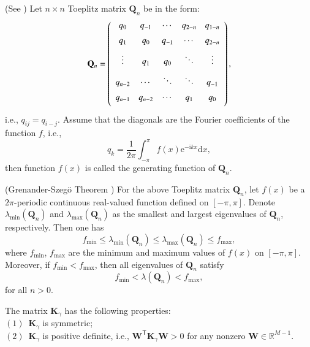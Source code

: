 \documentclass{siamart171218}
\numberwithin{theorem}{section}
\numberwithin{equation}{section}
\begin{document}
\begin{definition}(See \cite{Chan2007})\label{Def:1}
Let $n\times n$ Toeplitz matrix {$\mathbf{Q}_n$} be in the form:
$$\mathbf{Q}_n=
\left(
  \begin{array}{ccccc}
    q_0 & q_{-1} & \cdots & q_{2-n} & q_{1-n} \vspace{0.2 cm}\\
    q_{1} & q_{0} & q_{-1} & \cdots & q_{2-n}\vspace{0.2 cm}\\
    \vdots &q_{1} & q_{0} & \ddots & \vdots \vspace{0.2 cm}\\
   q_{n-2} & \cdots & \ddots & \ddots & q_{-1} \vspace{0.2 cm}\\
   q_{n-1}& q_{n-2}& \cdots &q_{1}& q_{0} \vspace{0.2 cm}\\
  \end{array}
\right),
$$
i.e., {$q_{ij}=q_{i-j}$}. Assume that the diagonals
are the
Fourier coefficients of {the} function $f$, i.e.,
$${q_k}=\frac{1}{2\pi}\int_{-\pi}^{\pi}f(x)
\mathrm{e}^{-\mathrm{i}kx}\mathrm{d}x,$$
then function $f(x)$ is called the generating function of
{$\mathbf{Q}_n$}.
\end{definition}

\begin{lemma}\label{Lem.3.2}(Grenander-Szeg\"{o} Theorem
\cite{Chan2011}) For the above
Toeplitz matrix ${\mathbf{Q}_n}$,
 let $f(x)$ be a $2\pi$-periodic continuous real-valued
function defined on $\left[-\pi, \pi\right]$. Denote
$\lambda_{\min}({\mathbf{Q}_n})$ and $\lambda_{\max}({\mathbf{Q}_n})$
as the smallest and largest eigenvalues of ${\mathbf{Q}_n}$,
respectively. Then one has
$$f_{\min}\leq \lambda_{\min}({\mathbf{Q}_n})
\leq \lambda_{\max}({\mathbf{Q}_n}) \leq
f_{\max},$$ where $f_{\min}$, $f_{\max}$ are
the minimum and maximum
values of $f(x)$ on $\left[-\pi, \pi\right]$.
Moreover, if $f_{\min} < f_{\max}$, then all
eigenvalues of ${\mathbf{Q}_n}$ satisfy
$$f_{\min}< \lambda({\mathbf{Q}_n}) < f_{\max},
$$ for all $n>0$.
\end{lemma}

\begin{lemma}\label{Lem.3.3}The matrix $\mathbf{K}_\gamma$ has
 the following properties:\\
$\mathrm{(1)}$~$\mathbf{K}_\gamma$ is symmetric;\;\\
$\mathrm{(2)}$~$\mathbf{K}_\gamma$ is positive definite,
 i.e., $\mathbf{W}^{\mathsf{T}}\mathbf{K}_\gamma \mathbf{W}>0$ for
any nonzero $\mathbf{W}\in \mathds{R}^{M-1}$.
\end{lemma}
\end{document}
